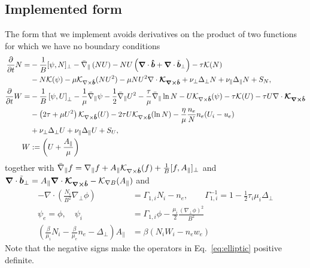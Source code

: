 \subsection{Implemented form}
The form that we implement avoids derivatives on the product of
two functions for which we have no boundary conditions
\begin{subequations}
    \begin{align}
    \frac{\partial}{\partial t} N =&
        - \frac{1}{B}[\psi, N]_{\perp}%
        - \bar \nabla_\parallel \left( NU\right)
        - NU\left(\vec \nabla\cdot\bhat+\vec \nabla\cdot\tilde{\vec b}_\perp\right)
        - \tau \mathcal K(N) \nonumber \\&
        - N \mathcal K(\psi)
        -\mu \mathcal K_{\nabla\times\bhat}(NU^2)
        -\mu NU^2\nabla\cdot \vec{ \mathcal K_{\nabla\times\bhat}}
        + \nu_\perp\Delta_\perp N + \nu_\parallel \Delta_\parallel N + S_N, \\
    \frac{\partial}{\partial t} W =&
        - \frac{1}{B}\left[\psi, U\right]_{\perp}%
        - \frac{1}{\mu} \bar \nabla_\parallel \psi%
        - \frac{1}{2}\bar \nabla_\parallel U^2
        -\frac{\tau}{\mu} \bar \nabla_\parallel \ln N
        - U\mathcal K_{\nabla\times\bhat}(\psi)
        - \tau \mathcal K(U)
        -\tau U\nabla\cdot\vec{ \mathcal K_{\nabla\times\bhat}}\nonumber\\&
        - \left(2\tau + {\mu}U^2\right) \mathcal K_{\nabla\times\bhat} (U)
        -2\tau U\mathcal K_{\nabla\times\bhat}(\ln N)
        - \frac{\eta}{\mu} \frac{n_e}{N}n_e(U_i - u_e) \nonumber\\&
        + \nu_\perp\Delta_\perp U
        + \nu_\parallel \Delta_\parallel U + S_U,
        \label{eq:EgyrofluidU} \\
        W&:= \left( U + \frac{A_\parallel}{\mu}\right)
    \end{align}
    \label{eq:Egyrofluid}
\end{subequations}
together with
$\bar\nabla_\parallel f = \nabla_\parallel f + A_\parallel \mathcal K_{\nabla\times\bm{\hat{b}}}(f) + \frac{1}{B}[ f, A_\parallel]_\perp$
and ${\boldsymbol{\nabla}} \cdot \tilde{ {\boldsymbol{b}}}_\perp = A_\parallel {\boldsymbol{\nabla}}\cdot{\boldsymbol{ \mathcal{ K}_{\nabla\times\bm{\hat{b}}}}} - \mathcal K_{\nabla B}(A_\parallel) $
and
\begin{subequations} \label{eq:elliptic}
  \begin{align}
    -\nabla\cdot\left( \frac{N_i}{B^2}\nabla_\perp \phi \right) &= \Gamma_{1,i} N_i - n_e, \quad\quad
    \Gamma_{1,i}^{-1} = 1-\frac{1}{2}\tau_i\mu_i \Delta_\perp \\
    \psi_e = \phi, \quad \psi_i &= \Gamma_{1,i}\phi -\frac{\mu_i}{2}\frac{(\nabla_\perp\phi)^2}{B^2} \\
    \left(\frac{\beta}{\mu_i}N_i - \frac{\beta}{\mu_e}n_e-\Delta_\perp\right)
    A_\parallel &= \beta\left(N_iW_i-n_e w_e\right)
  \end{align}
\end{subequations}
Note that the negative signs make the operators in Eq.~\eqref{eq:elliptic} positive definite.
